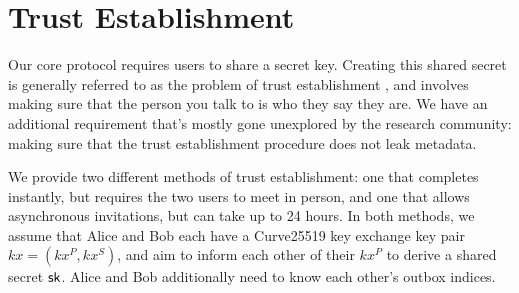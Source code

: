 \section{Trust Establishment}
\label{sec:trustestablishment}

Our core protocol requires users to share a secret key. Creating this shared secret is generally referred to as the problem of trust establishment \cite{unger2015sok}, and involves making sure that the person you talk to is who they say they are. We have an additional requirement that's mostly gone unexplored by the research community: making sure that the trust establishment procedure does not leak metadata.


We provide two different methods of trust establishment: one that completes instantly, but requires the two users to meet in person, and one that allows asynchronous invitations, but can take up to 24 hours. In both methods, we assume that Alice and Bob each have a Curve25519 key exchange key pair $kx = (kx^P, kx^S)$, and aim to inform each other of their $kx^P$ to derive a shared secret ${\mathsf{sk}}$. Alice and Bob additionally need to know each other's outbox indices.








